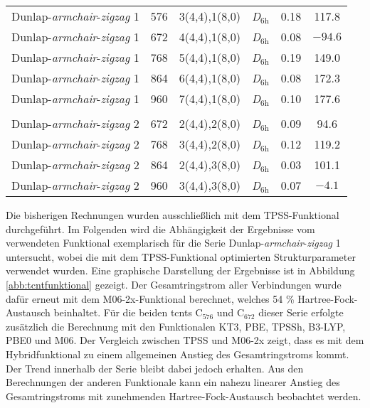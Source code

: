 \begin{table}[htbp!]
{\begin{tabular}{lccccS[table-format = 3.1]}
    Dunlap-\textit{armchair}-\textit{zigzag} 1& 576   & 3(4,4),1(8,0) & \textit{D}$_{6\text{h}}$   & 0.18  & 117.8 \\
    Dunlap-\textit{armchair}-\textit{zigzag} 1& 672   & 4(4,4),1(8,0) & \textit{D}$_{6\text{h}}$   & 0.08  & $\num{-94.6}$ \\
    Dunlap-\textit{armchair}-\textit{zigzag} 1& 768   & 5(4,4),1(8,0) & \textit{D}$_{6\text{h}}$   & 0.19  & 149.0 \\
    Dunlap-\textit{armchair}-\textit{zigzag} 1& 864   & 6(4,4),1(8,0) & \textit{D}$_{6\text{h}}$   & 0.08  & 172.3 \\
    Dunlap-\textit{armchair}-\textit{zigzag} 1& 960   & 7(4,4),1(8,0) & \textit{D}$_{6\text{h}}$   & 0.10  & 177.6 \\
          &       &       &       &       &  \\
    Dunlap-\textit{armchair}-\textit{zigzag} 2& 672   & 2(4,4),2(8,0) & \textit{D}$_{6\text{h}}$   & 0.09  & 94.6 \\
    Dunlap-\textit{armchair}-\textit{zigzag} 2& 768   & 3(4,4),2(8,0) & \textit{D}$_{6\text{h}}$   & 0.12  & 119.2 \\
    Dunlap-\textit{armchair}-\textit{zigzag} 2& 864   & 2(4,4),3(8,0) & \textit{D}$_{6\text{h}}$   & 0.03  & 101.1 \\
    Dunlap-\textit{armchair}-\textit{zigzag} 2& 960   & 3(4,4),3(8,0) & \textit{D}$_{6\text{h}}$   & 0.07  & $\num{-4.1}$ \\
    \end{tabular}}%
  \label{tab:tcnt}%
\end{table}%
\FloatBarrier
\newpage
Die bisherigen Rechnungen wurden ausschließlich mit dem TPSS-Funktional durchgeführt. Im Folgenden wird die Abhängigkeit der Ergebnisse vom verwendeten Funktional exemplarisch für die Serie \glqq Dunlap-\textit{armchair}-\textit{zigzag} 1\grqq{} untersucht, wobei die mit dem TPSS-Funktional optimierten Strukturparameter verwendet wurden. Eine graphische Darstellung der Ergebnisse ist in Abbildung \ref{abb:tcntfunktional} gezeigt. Der Gesamtringstrom aller Verbindungen wurde dafür erneut mit dem M06-2x-Funktional\supercite{zhao2008m06} berechnet, welches 54 \% Hartree-Fock-Austausch beinhaltet. Für die beiden \acp{tcnt} C$_{576}$ und C$_{672}$ dieser Serie erfolgte zusätzlich die Berechnung mit den Funktionalen KT3\supercite{keal2004semiempirical}, PBE\supercite{perdew1996generalized}, TPSSh\supercite{staroverov2003comparative}, B3-LYP\supercite{becke1993density,lee1988development,stephens1994ab}, PBE0\supercite{adamo1999toward} und M06\supercite{zhao2008m06}. Der Vergleich zwischen TPSS und M06-2x zeigt, dass es mit dem Hybridfunktional zu einem allgemeinen Anstieg des Gesamtringstroms kommt. Der Trend innerhalb der Serie bleibt dabei jedoch erhalten. Aus den Berechnungen der anderen Funktionale kann ein nahezu linearer Anstieg des Gesamtringstroms mit zunehmenden Hartree-Fock-Austausch beobachtet werden.

